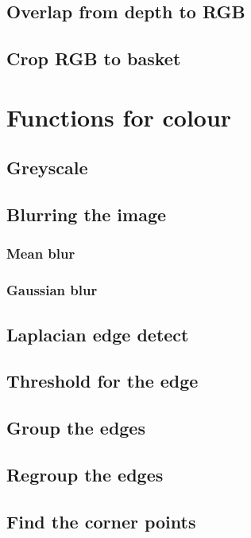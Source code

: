 \documentclass[10pt]{article}
\begin{document}
\subsection{Overlap from depth to RGB}

\subsection{Crop RGB to basket}


\section{Functions for colour}
\subsection{Greyscale}

\subsection{Blurring the image}
\subsubsection{Mean blur}

\subsubsection{Gaussian blur}


\subsection{Laplacian edge detect}

\subsection{Threshold for the edge}

\subsection{Group the edges}

\subsection{Regroup the edges}

\subsection{Find the corner points}

\end{document}
